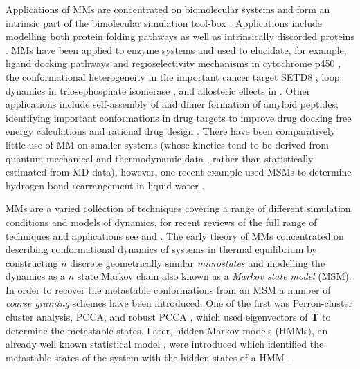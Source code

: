 Applications of MMs are concentrated on biomolecular systems and form an intrinsic part of the bimolecular simulation tool-box \cite{hugginsBiomolecularSimulationsDynamics2019}. Applications include modelling both protein folding pathways \cite{singhalUsingPathSampling2004}\cite{swopeDescribingProteinFolding2004} as well as intrinsically discorded proteins \cite{schorAnalyticalMethodsStructural2016a}. 
MMs have been applied to enzyme systems and used to elucidate, for example, ligand docking pathways \cite{ahalawatMappingSubstrateRecognition2018a} and regioselectivity mechanisms in cytochrome p450 \cite{dodaniDiscoveryRegioselectivitySwitch2016a}, the conformational heterogeneity in the important cancer target SETD8 \cite{chenDynamicConformationalLandscape2019a}, loop dynamics in  triosephosphate isomerase \cite{LoopMotionTriosephosphate}, and allosteric effects in \cite{wapeesittipanAllostericEffectsCyclophilin2019}. Other applications include self-assembly of  \cite{senguptaAutomatedMarkovState2019} and dimer formation \cite{leahyCoarseMasterEquations2016} of amyloid peptides; identifying important conformations in drug targets to improve drug docking free energy calculations  \cite{amaroEnsembleDockingDrug2018} and rational drug design \cite{gervasioBiomolecularSimulationsStructureBased2019}. There have been comparatively little use of MM on smaller systems (whose kinetics tend to be derived from quantum mechanical and thermodynamic data \cite{glowackiMESMEROpenSourceMaster2012} \cite{pillingMasterEquationModels2003}, rather than statistically estimated from MD data), however, one recent example used MSMs to determine hydrogen bond rearrangement in liquid water \cite{schulzCollectiveHydrogenbondRearrangement2018}. 

MMs are a varied collection of techniques covering a range of different simulation conditions and models of dynamics, for recent reviews of the full range of techniques and applications see \cite{husicMarkovStateModels2018} and \cite{noeMarkovModelsMolecular2019b}.  The early theory of MMs concentrated on describing conformational dynamics of systems in thermal equilibrium by constructing $n$ discrete geometrically similar \emph{microstates} and modelling the dynamics as a $n$ state Markov chain \cite{singhalUsingPathSampling2004} \cite{swopeDescribingProteinFolding2004} \cite{prinzMarkovModelsMolecular2011} also known as a \emph{Markov state model} (MSM). In order to recover the metastable conformations from an MSM a number of \emph{coarse graining} schemes have been introduced. One of the first was Perron-cluster cluster analysis, PCCA,  \cite{deuflhardIdentificationAlmostInvariant2000a} and robust PCCA   \cite{deuflhardRobustPerronCluster2005b}, which used eigenvectors of $\mathbf{T}$ to determine the metastable states. Later, hidden Markov models (HMMs), an already well known statistical model \cite{rabinerTutorialHiddenMarkov1989}, were introduced  which  identified the metastable states of the system with the hidden states of a HMM \cite{noeMarkovModelsMolecular2019b}. 

